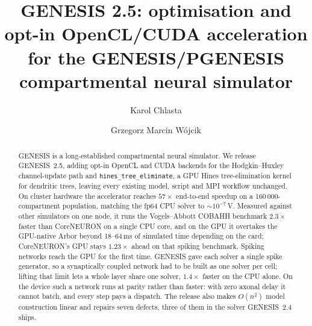 \documentclass[preprint,12pt, a4paper]{elsarticle}
\newcommand{\hte}{\texttt{hines\_\allowbreak tree\_\allowbreak eliminate}}
\begin{document}
\renewcommand{\labelenumii}{\arabic{enumi}.\arabic{enumii}}

\begin{frontmatter}



\title{GENESIS 2.5: optimisation and opt-in OpenCL/CUDA acceleration for the GENESIS/PGENESIS compartmental neural simulator}

\author[1]{Karol Chlasta}
\author[2]{Grzegorz Marcin W\'ojcik}

\address[1]{Kozminski University, ul. Jagiello\'nska 57/59, 03-301 Warsaw, Poland; WarsawIQ, Al. Jana Paw\l{}a II 43A/37B, 01-001 Warsaw, Poland}
\address[2]{Maria Curie-Sk{\l}odowska University, ul. Akademicka 9, 20-033 Lublin, Poland}


\begin{abstract}
GENESIS is a long-established compartmental neural simulator. We release GENESIS~2.5, adding opt-in OpenCL and CUDA backends for the Hodgkin--Huxley channel-update path and \hte{}, a GPU Hines tree-elimination kernel for dendritic trees, leaving every existing model, script and MPI workflow unchanged. On cluster hardware the accelerator reaches $57\times$ end-to-end speedup on a 160\,000-compartment population, matching the fp64 CPU solver to $\sim$$10^{-7}$\,V. Measured against other simulators on one node, it runs the Vogels--Abbott COBAHH benchmark $2.3\times$ faster than CoreNEURON on a single CPU core, and on the GPU it overtakes the GPU-native Arbor beyond 18--64\,ms of simulated time depending on the card; CoreNEURON's GPU stays $1.23\times$ ahead on that spiking benchmark. Spiking networks reach the GPU for the first time. GENESIS gave each solver a single spike generator, so a synaptically coupled network had to be built as one solver per cell; lifting that limit lets a whole layer share one solver, $1.4\times$ faster on the CPU alone. On the device such a network runs at parity rather than faster: with zero axonal delay it cannot batch, and every step pays a dispatch. The release also makes $O(n^2)$ model construction linear and repairs seven defects, three of them in the solver GENESIS~2.4 ships.
\end{abstract}


\end{frontmatter}
\end{document}
